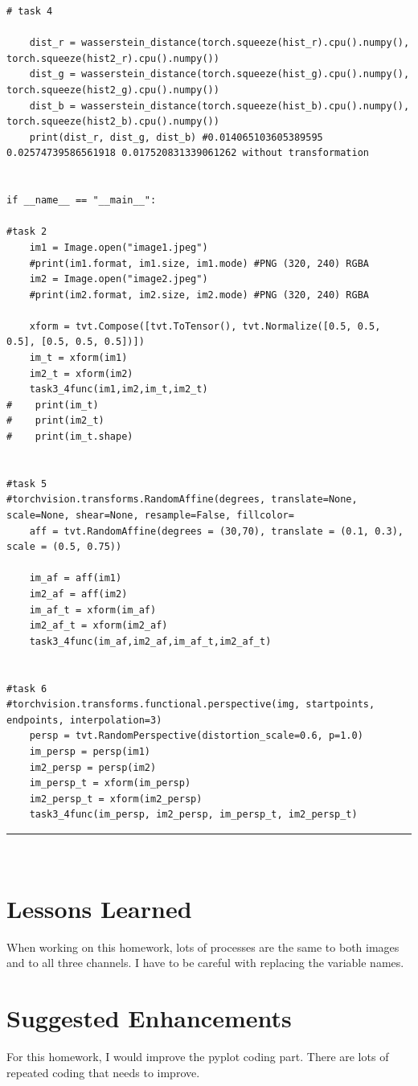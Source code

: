\documentclass{article}
\begin{document}
\begin{verbatim}
# task 4

    dist_r = wasserstein_distance(torch.squeeze(hist_r).cpu().numpy(), torch.squeeze(hist2_r).cpu().numpy())
    dist_g = wasserstein_distance(torch.squeeze(hist_g).cpu().numpy(), torch.squeeze(hist2_g).cpu().numpy())
    dist_b = wasserstein_distance(torch.squeeze(hist_b).cpu().numpy(), torch.squeeze(hist2_b).cpu().numpy())
    print(dist_r, dist_g, dist_b) #0.014065103605389595 0.02574739586561918 0.017520831339061262 without transformation


if __name__ == "__main__":

#task 2
    im1 = Image.open("image1.jpeg")
    #print(im1.format, im1.size, im1.mode) #PNG (320, 240) RGBA
    im2 = Image.open("image2.jpeg")
    #print(im2.format, im2.size, im2.mode) #PNG (320, 240) RGBA

    xform = tvt.Compose([tvt.ToTensor(), tvt.Normalize([0.5, 0.5, 0.5], [0.5, 0.5, 0.5])])
    im_t = xform(im1)
    im2_t = xform(im2)
    task3_4func(im1,im2,im_t,im2_t)
#    print(im_t)
#    print(im2_t)
#    print(im_t.shape)


#task 5
#torchvision.transforms.RandomAffine(degrees, translate=None, scale=None, shear=None, resample=False, fillcolor=
    aff = tvt.RandomAffine(degrees = (30,70), translate = (0.1, 0.3), scale = (0.5, 0.75))

    im_af = aff(im1)
    im2_af = aff(im2)
    im_af_t = xform(im_af)
    im2_af_t = xform(im2_af)
    task3_4func(im_af,im2_af,im_af_t,im2_af_t)


#task 6
#torchvision.transforms.functional.perspective(img, startpoints, endpoints, interpolation=3)
    persp = tvt.RandomPerspective(distortion_scale=0.6, p=1.0)
    im_persp = persp(im1)
    im2_persp = persp(im2)
    im_persp_t = xform(im_persp)
    im2_persp_t = xform(im2_persp)
    task3_4func(im_persp, im2_persp, im_persp_t, im2_persp_t)
\end{verbatim}
\vspace{-0.45in}
\textcolor{red}{\rule[-0.3in]{6.1in}{0.03in}}\\

\section{Lessons Learned}
When working on this homework, lots of processes are the same to both images and to all three channels. I have to be careful with replacing the variable names.
\section{Suggested Enhancements}
For this homework, I would improve the pyplot coding part. There are lots of repeated coding that needs to improve.
\end{document}
